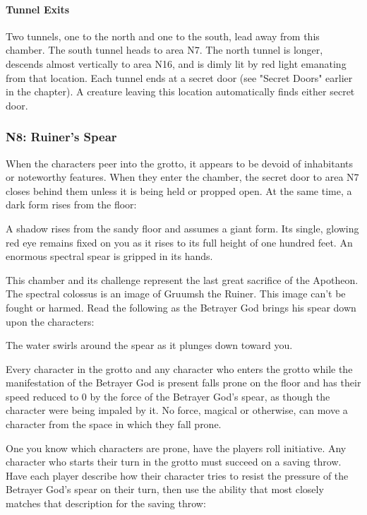 \documentclass[10pt,a4paper,twoside,twocolumn,openany,nodeprecatedcode]{dndbook}
\begin{document}
\paragraph{Tunnel Exits}
Two tunnels, one to the north and one to the south, lead away from this chamber. The south tunnel heads to area N7. The north tunnel is longer, descends almost vertically to area N16, and is dimly lit by red light emanating from that location. Each tunnel ends at a secret door (see "Secret Doors" earlier in the chapter). A creature leaving this location automatically finds either secret door.

\subsubsection{N8: Ruiner's Spear}
When the characters peer into the grotto, it appears to be devoid of inhabitants or noteworthy features. When they enter the chamber, the secret door to area N7 closes behind them unless it is being held or propped open. At the same time, a dark form rises from the floor:

\begin{DndReadAloud}{}
A shadow rises from the sandy floor and assumes a giant form. Its single, glowing red eye remains fixed on you as it rises to its full height of one hundred feet. An enormous spectral spear is gripped in its hands.

\end{DndReadAloud}

This chamber and its challenge represent the last great sacrifice of the Apotheon. The spectral colossus is an image of Gruumsh the Ruiner. This image can't be fought or harmed. Read the following as the Betrayer God brings his spear down upon the characters:

\begin{DndReadAloud}{}
The water swirls around the spear as it plunges down toward you.

\end{DndReadAloud}

Every character in the grotto and any character who enters the grotto while the manifestation of the Betrayer God is present falls prone on the floor and has their speed reduced to 0 by the force of the Betrayer God's spear, as though the character were being impaled by it. No force, magical or otherwise, can move a character from the space in which they fall prone.

One you know which characters are prone, have the players roll initiative. Any character who starts their turn in the grotto must succeed on a saving throw. Have each player describe how their character tries to resist the pressure of the Betrayer God's spear on their turn, then use the ability that most closely matches that description for the saving throw:
\end{document}
